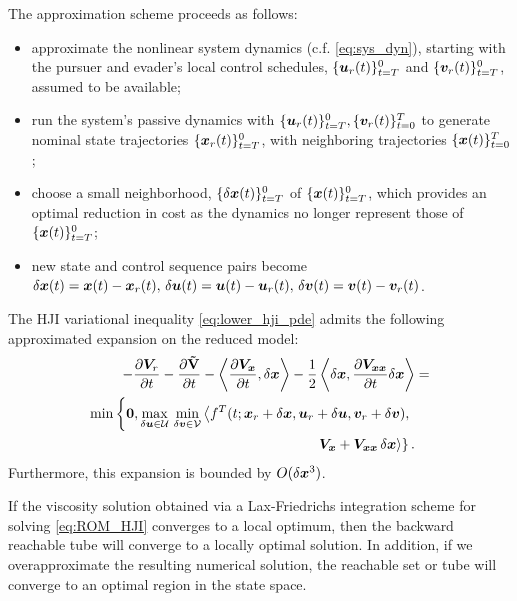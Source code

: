 The approximation scheme proceeds as follows:
%
\begin{itemize}
	\item approximate the nonlinear system dynamics (c.f. \eqref{eq:sys_dyn}), starting with the pursuer and evader's local control schedules, $\{ \bm{u}_r(t)\}_{t=T}^0$ and $\{ \bm{v}_r(t) \}_{t=T}^0$, assumed to be available; %
	\item  run the system's passive dynamics with $\{\bm{u}_r(t)\}_{t=T}^0, \{ {\bm{v}_r(t)} \}_{t=0}^T$ to generate  nominal state trajectories $ \{\bm{x}_r(t)\}_{t=T}^0$, with neighboring trajectories $\{ \bm{x}(t) \}_{t=0}^T$; %
	\item choose a small neighborhood, $\{\delta \bm{x}(t)\}_{t=T}^0$ of $\{\bm{x}(t)\}_{t=T}^0$, which provides an optimal reduction in cost as the dynamics no longer represent those of $\{\bm{x}(t)\}_{t=T}^0$;
	\item   new state and control sequence pairs become $\delta \bm{x}(t) = \bm{x}(t) - \bm{x}_r(t), \,
	\delta \bm{u}(t) = \bm{u}(t) - \bm{u}_r(t), \,
	\delta \bm{v}(t) = \bm{v}(t) - \bm{v}_r(t)$.
\end{itemize}

\begin{theorem}
	The HJI variational inequality \cf \eqref{eq:lower_hji_pde} admits the following approximated expansion on the reduced model:
	\begin{align}
		\begin{split} 
			-\frac{\partial \valuefunc_r}{\partial t} -\frac{\partial \costdiff}{\partial t} - \left\langle \dfrac{\partial\valuefunc_{\state}}{\partial t}, \delta\state \right \rangle -  \dfrac{1}{2} \left\langle \delta \state, \dfrac{\partial \valuefunc_{\state\state} }{\partial t}\delta\state \right \rangle &=  \\
			\min \left\{\bm{0},  
			\max_{\delta \control \in \mathcal{U}} \, \min_{\delta \disturb \in \mathcal{V}} \left\langle f^T(t; \state_r + \delta \state, \control_r + \delta \control,  \disturb_r + \delta \disturb), \right. \right. \\
			\left. \left. \valuefunc_{\state} +  \valuefunc_{\state\state}\, \delta \state \right\rangle \right\}. 
		\end{split}
		\label{eq:ROM_HJI}
	\end{align}
	Furthermore, this expansion is bounded by $O(\delta \bm{x}^3)$.
	\label{th:quad_approx}
\end{theorem}
%
\begin{corollary}
	If the viscosity solution obtained via a Lax-Friedrichs integration scheme for solving \eqref{eq:ROM_HJI} converges to a local optimum, then the backward reachable tube will converge to a locally optimal solution. In addition, if we overapproximate the resulting numerical solution, the reachable set or tube will converge to an optimal region in the state space.
\end{corollary}


